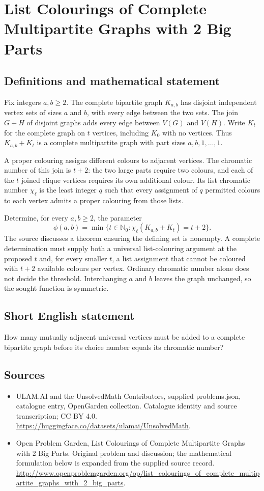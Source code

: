 \documentclass[11pt,a4paper]{article}
\begin{document}
\section*{List Colourings of Complete Multipartite Graphs with 2 Big Parts}\label{statement}

\subsection{Definitions and mathematical statement}
Fix integers $a,b\ge2$. The complete bipartite graph $K_{a,b}$ has disjoint
independent vertex sets of sizes $a$ and $b$, with every edge between the
two sets. The join $G+H$ of disjoint graphs adds every edge between
$V(G)$ and $V(H)$. Write $K_t$ for the complete graph on $t$ vertices,
including $K_0$ with no vertices. Thus $K_{a,b}+K_t$ is a complete
multipartite graph with part sizes $a,b,1,\ldots,1$.

A proper colouring assigns different colours to adjacent vertices.
The chromatic number of this join is $t+2$: the two large parts require
two colours, and each of the $t$ joined clique vertices requires its own
additional colour. Its list chromatic number $\chi_\ell$ is the least
integer $q$ such that every assignment of $q$ permitted colours to each
vertex admits a proper colouring from those lists.

Determine, for every $a,b\ge2$, the parameter
\[
 \phi(a,b)=\min\{t\in\mathbb N_0:
                 \chi_\ell(K_{a,b}+K_t)=t+2\}.
\]
The source discusses a theorem ensuring the defining set is nonempty.
A complete determination must supply both a universal list-colouring
argument at the proposed $t$ and, for every smaller $t$, a list assignment
that cannot be coloured with $t+2$ available colours per vertex. Ordinary
chromatic number alone does not decide the threshold. Interchanging $a$
and $b$ leaves the graph unchanged, so the sought function is symmetric.
\subsection{Short English statement}
How many mutually adjacent universal vertices must be added to a complete bipartite graph before its choice number equals its chromatic number?
\subsection{Sources}
\begin{itemize}
\item[S1] ULAM.AI and the UnsolvedMath Contributors, supplied problems.json, catalogue entry, OpenGarden collection. Catalogue identity and source transcription; CC BY 4.0.
\url{https://huggingface.co/datasets/ulamai/UnsolvedMath}.
\item[S2] Open Problem Garden, List Colourings of Complete Multipartite Graphs with 2 Big Parts. Original problem and discussion; the mathematical formulation below is expanded from the supplied source record.
\url{http://www.openproblemgarden.org/op/list_colourings_of_complete_multipartite_graphs_with_2_big_parts}.
\end{itemize}
\end{document}
